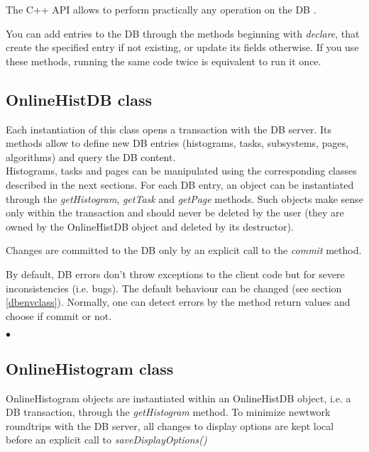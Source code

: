 \documentclass{lhcbnote}
\begin{document}
The C++ API allows to perform practically any operation on the DB .

You can add entries to the DB through the methods beginning with {\it
declare}, that create the specified entry if not existing, or 
update its fields otherwise. If you use these methods, running the
same code twice is equivalent to run it once.


\subsection{OnlineHistDB class}
Each instantiation of this class opens a transaction with the DB
server. Its methods allow to define new DB entries (histograms,
tasks, subsystems, pages, algorithms) and query the DB content. \\
Histograms, tasks and pages can be manipulated using the corresponding
classes described in the next sections. For each DB entry, an object can be
instantiated through the {\it getHistogram},  {\it getTask} and {\it
getPage} methods. Such objects make sense only within the transaction
and should never be deleted by the user (they are owned by the
OnlineHistDB object and deleted by its destructor). 

Changes are committed to the DB only by an explicit call to the {\it
commit} method.

By default, DB errors don't throw exceptions to the client code but
for severe inconsistencies (i.e. bugs). The default behaviour can be
changed (see section \ref{dbenvclass}). Normally, one can detect
errors by the method return values and choose if commit or not. 


\begin{list}{$\bullet$}{}



\end{list}


\subsection{OnlineHistogram class}

OnlineHistogram objects are instantiated within an
OnlineHistDB object, i.e. a DB transaction, through the {\it
getHistogram} method. To minimize newtwork roundtrips with the DB
server, all changes to display options are kept local before an
explicit call to {\it saveDisplayOptions()}
\end{document}
